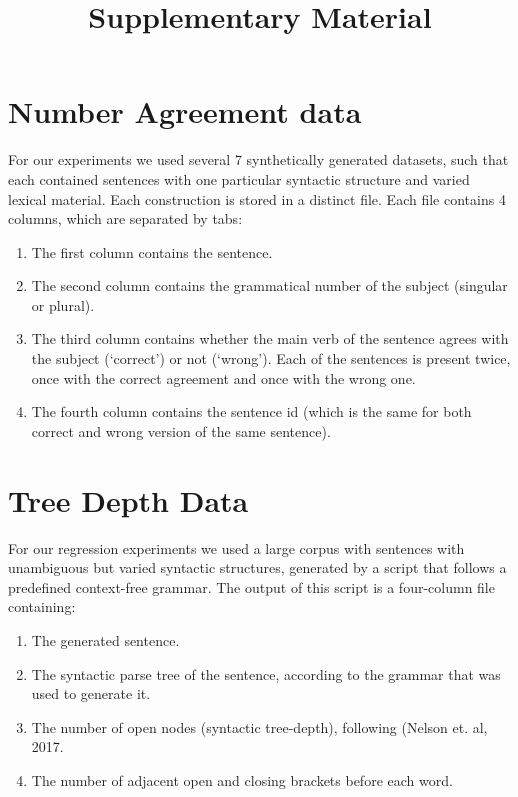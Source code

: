 \documentclass{article}
\title{Supplementary Material}
\date{}
\author{}
\begin{document}
\maketitle

\section*{Number Agreement data}

For our experiments we used several 7 synthetically generated datasets, such that each contained sentences with one particular syntactic structure and varied lexical material.
Each construction is stored in a distinct file.
Each file contains 4 columns, which are separated by tabs:

\begin{enumerate}
    \item The first column contains the sentence.
    \item The second column contains the grammatical number of the subject (singular or plural).
    \item The third column contains whether the main verb of the sentence agrees with the subject (`correct') or not (`wrong'). Each of the sentences is present twice, once with the correct agreement and once with the wrong one.
    \item The fourth column contains the sentence id (which is the same for both correct and wrong version of the same sentence).
\end{enumerate}

\section*{Tree Depth Data}
For our regression experiments we used a large corpus with sentences with unambiguous but varied syntactic structures, generated by a script that follows a predefined context-free grammar.
The output of this script is a four-column file containing:\begin{enumerate}
    \item The generated sentence.
    \item The syntactic parse tree of the sentence, according to the grammar that was used to generate it.
    \item The number of open nodes (syntactic tree-depth), following (Nelson et. al, 2017.
    \item The number of adjacent open and closing brackets before each word.
\end{enumerate}
\end{document}
